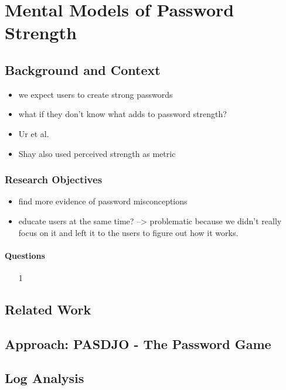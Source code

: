\chapter[Mental Models of Password Strength]{Mental Models of Password Strength}\label{chap:pasdjo}

\section{Background and Context}

\begin{itemize}
\item we expect users to create strong passwords
\item what if they don't know what adds to password strength?
\item Ur et al. \cite{Ur2016PerceptionsPassword}
\item  Shay \etal also used perceived strength as metric \cite{Shay2015SpoonfulOfSugar}
\end{itemize}


\subsection{Research Objectives}
\begin{itemize}
	\item find more evidence of password misconceptions
	\item educate users at the same time? --> problematic because we didn't really focus on it and left it to the users to figure out how it works.
\end{itemize}

\subsubsection{Questions}
\begin{itemize}
\item[1] 
\end{itemize}

\section{Related Work}

\section{Approach: PASDJO - The Password Game}


\section{Log Analysis}

